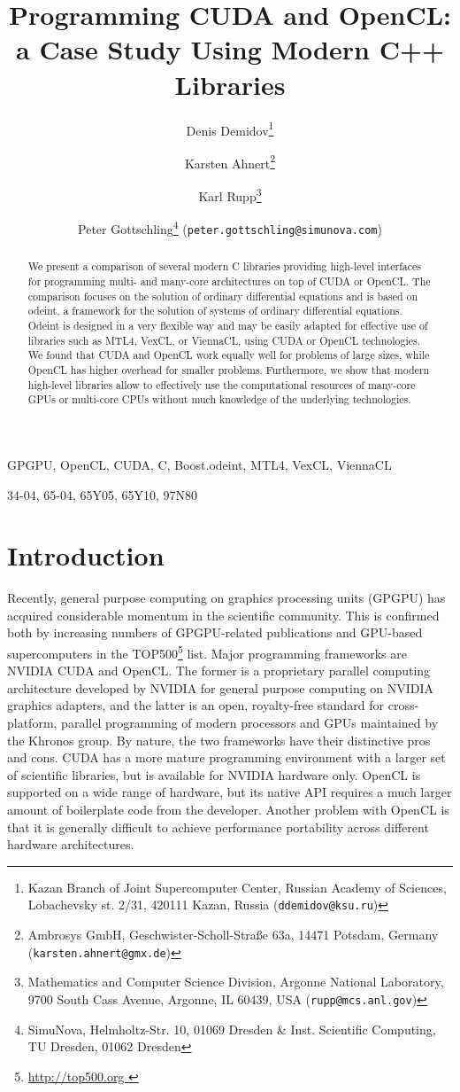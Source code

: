 \documentclass[final]{siamltex}
\title{Programming CUDA and OpenCL:\\a Case Study Using Modern C++ Libraries}
\author{
Denis Demidov\thanks{
Kazan Branch of Joint Supercomputer Center,
Russian Academy of Sciences,
Lobachevsky st. 2/31, 420111 Kazan, Russia
({\tt ddemidov@ksu.ru}) }
\and Karsten Ahnert\thanks{Ambrosys GmbH, Geschwister-Scholl-Stra\ss e 63a, 14471 Potsdam, Germany ({\tt karsten.ahnert@gmx.de}) }
\and Karl Rupp\thanks{Mathematics and Computer Science Division,
Argonne National Laboratory,
9700 South Cass Avenue, Argonne, IL 60439, USA
({\tt rupp@mcs.anl.gov}) }
\and Peter Gottschling\thanks{SimuNova, Helmholtz-Str. 10, 01069 Dresden \&
Inst. Scientific Computing, TU Dresden, 01062 Dresden}
({\tt peter.gottschling@simunova.com}) }
\newcommand{\addpp}[1]{{#1\nolinebreak[4]\hspace{-.05em}\raisebox{.4ex}{\tiny\bf ++}}\xspace}
\newcommand{\Cpp}{\addpp{C}}
\begin{document}
\maketitle

\begin{abstract}
    We present a comparison of several modern \Cpp libraries providing high-level interfaces
    for programming multi- and many-core architectures on top of CUDA or OpenCL.
    The comparison focuses on the solution of ordinary differential equations and is based on odeint,
    a framework for the solution of systems of ordinary differential equations. Odeint is designed in a
    very flexible way and may be easily adapted for effective use of libraries such
    as MTL4, VexCL, or ViennaCL, using CUDA or OpenCL technologies.
    We found that CUDA and OpenCL work equally well for problems
    of large sizes, while OpenCL has higher overhead for smaller problems.
    Furthermore, we show that modern high-level libraries allow to effectively
    use the computational resources of many-core GPUs or multi-core CPUs without much
    knowledge of the underlying technologies.
\end{abstract}

\begin{keywords}
    GPGPU, OpenCL, CUDA, \Cpp, Boost.odeint, MTL4, VexCL, ViennaCL
\end{keywords}

\begin{AMS}
    34-04, 65-04, 65Y05, 65Y10, 97N80
\end{AMS}


%
%
\section{Introduction}

\pagestyle{myheadings}

\thispagestyle{plain}


Recently, general purpose computing on graphics processing units (GPGPU) has
acquired considerable momentum in the scientific community. This is confirmed
both by increasing numbers of GPGPU-related publications and GPU-based
supercomputers in the TOP500\footnote{ \href{ http://top500.org }{
http://top500.org }} list. Major programming frameworks are NVIDIA CUDA and
OpenCL.
The former is a proprietary parallel computing architecture developed
by NVIDIA for general purpose computing on NVIDIA graphics adapters, and the
latter is an open, royalty-free standard for cross-platform, parallel
programming of modern processors and GPUs maintained by the Khronos group. By
nature, the two frameworks have their distinctive pros and cons. CUDA has a
more mature programming environment with a larger set of scientific libraries,
but is available for NVIDIA hardware only. OpenCL is supported on a wide range
of hardware, but its native API requires a much larger amount of boilerplate
code from the developer. Another problem with OpenCL is that it is generally
difficult to achieve performance portability across different hardware
architectures.
\end{document}
